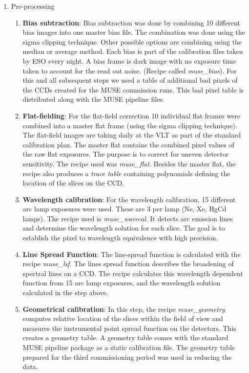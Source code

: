 \begin{enumerate}
        \item Pre-processing
                \begin{enumerate}[I]
			\item \textbf{Bias subtraction}: Bias subtraction was done by combining 10 different bias images into one master bias file. The combination was done using the sigma clipping technique. Other possible options are combining using the median or average method. Each bias is part of the calibration files taken by ESO every night. A bias frame is dark image with no exposure time taken to account for the read out noise. (Recipe called \emph{muse\_bias}). For this and all subsequent steps we used a table of additional bad pixels of the CCDs created for the MUSE commission runs. This bad pixel table is distributed along with the MUSE pipeline files. 
            \item \textbf{Flat-fielding}: For the flat-field correction 10 individual flat frames were combined into a master flat frame (using the sigma clipping technique). The flat-field images are taking daily at the VLT as part of the standard calibration plan.  The master flat  contains  the  combined  pixel  values  of  the  raw  flat exposures. The purpose is to correct for uneven detector sensitivity. The recipe used was \emph{muse\_flat}. Besides the master flat, the recipe also produces a \emph{trace table} containing polynomials defining the location of the slices on the CCD. 
			\item \textbf{Wavelength calibration}: For the wavelength calibration, 15 different arc lamp exposures were used. These are 3 per lamp (Ne, Xe, HgCd lamps). The recipe used is \emph{muse\_wavecal}. It detects arc emission lines and determine the wavelength solution for each slice. The goal is to establish the pixel to wavelength equivalence with high precision.
			\item \textbf{Line Spread Function}: The line-spread function is calculated with the recipe \emph{muse\_lsf}. The lines spread function describes the broadening of spectral lines on a CCD. The recipe calculates this  wavelength dependent function from 15 arc lamp exposures, and the wavelength solution calculated in the step above.  
			\item \textbf{Geometrical calibration}: In this step, the recipe \emph{muse\_geometry} computes  relative  location  of the slices within the field of view and measures the instrumental point spread function on the detectors. This creates a geometry table. A geometry table comes with the standard MUSE pipeline package as a static calibration file. The geometry table prepared for the third commissioning period was used in reducing the data. 

\end{enumerate}
\end{enumerate}
